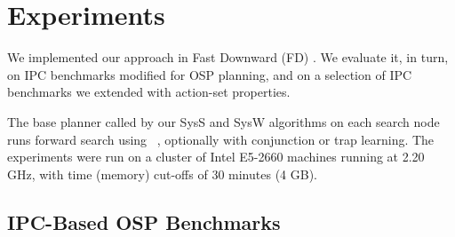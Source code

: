 

\newcommand{\scatterplotsize}{8cm}
\newcommand{\scatterplotxlabelshift}{1.5ex}
\newcommand{\scatterplotylabelshift}{-3ex}



\section{Experiments}
\label{experiments}


We implemented our approach in Fast Downward
(FD) \cite{helmert:jair-06}. We evaluate it, in turn, on IPC
benchmarks modified for OSP planning, and on a selection of IPC
benchmarks we extended with action-set properties.

The base planner called by our SysS and SysW algorithms on each search
node runs forward search using
\hff\ \cite{hoffmann:nebel:jair-01}, optionally with conjunction or trap learning.
%
%
The experiments were run on a cluster of Intel E5-2660 machines
running at 2.20 GHz, with time (memory) cut-offs of 30 minutes (4 GB).



 




\subsection{IPC-Based OSP Benchmarks}
\label{experiments:ipc}

%

